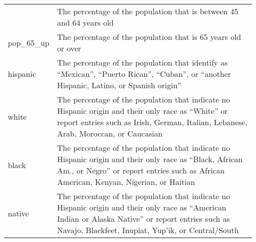 \documentclass[12pt,twoside]{reedthesis}
\theoremstyle{definition}
\theoremstyle{definition}
\theoremstyle{definition}
\theoremstyle{remark}
\begin{document}
\begin{longtable}[]{@{}ll@{}}
\begin{minipage}[t]{0.44\columnwidth}
\end{minipage} & \begin{minipage}[t]{0.50\columnwidth}\raggedright
The percentage of the population that is between 45 and 64 years
old\strut
\end{minipage}\tabularnewline
\begin{minipage}[t]{0.44\columnwidth}\raggedright
pop\_65\_up\strut
\end{minipage} & \begin{minipage}[t]{0.50\columnwidth}\raggedright
The percentage of the population that is 65 years old or over\strut
\end{minipage}\tabularnewline
\begin{minipage}[t]{0.44\columnwidth}\raggedright
hispanic\strut
\end{minipage} & \begin{minipage}[t]{0.50\columnwidth}\raggedright
The percentage of the population that identify as ``Mexican'', ``Puerto
Rican'', ``Cuban'', or ``another Hispanic, Latino, or Spanish
origin''\strut
\end{minipage}\tabularnewline
\begin{minipage}[t]{0.44\columnwidth}\raggedright
white\strut
\end{minipage} & \begin{minipage}[t]{0.50\columnwidth}\raggedright
The percentage of the population that indicate no Hispanic origin and
their only race as ``White'' or report entries such as Irish, German,
Italian, Lebanese, Arab, Moroccan, or Caucasian\strut
\end{minipage}\tabularnewline
\begin{minipage}[t]{0.44\columnwidth}\raggedright
black\strut
\end{minipage} & \begin{minipage}[t]{0.50\columnwidth}\raggedright
The percentage of the population that indicate no Hispanic origin and
their only race as ``Black, African Am., or Negro'' or report entries
such as African American, Kenyan, Nigerian, or Haitian\strut
\end{minipage}\tabularnewline
\begin{minipage}[t]{0.44\columnwidth}\raggedright
native\strut
\end{minipage} & \begin{minipage}[t]{0.50\columnwidth}\raggedright
The percentage of the population that indicate no Hispanic origin and
their only race as ``American Indian or Alaska Native'' or report
entries such as Navajo, Blackfeet, Inupiat, Yup'ik, or Central/South

\end{minipage}
\end{longtable}
\end{document}
